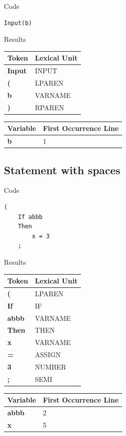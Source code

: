 \documentclass{article}
\begin{document}
\begin{resultbox}{Code}
\begin{lstlisting}[style=yalccstyle]
Input(b)
\end{lstlisting}
\end{resultbox}

\begin{resultbox}{Results}
\begin{tabularx}{\linewidth}{|>{\bfseries}X|X|}
\toprule
Token & Lexical Unit \\
\midrule
Input & INPUT \\
( & LPAREN \\
b & VARNAME \\
) & RPAREN \\
\bottomrule
\end{tabularx}

\vspace{2em}

\begin{tabularx}{\linewidth}{|>{\bfseries}X|X|}
\toprule
Variable & First Occurrence Line \\
\midrule
b & 1 \\
\bottomrule
\end{tabularx}
\end{resultbox}

\subsection{Statement with spaces}

\begin{resultbox}{Code}
\begin{lstlisting}[style=yalccstyle]
(
    If abbb
    Then
        x = 3
    ;
\end{lstlisting}
\end{resultbox}

\begin{resultbox}{Results}
\begin{tabularx}{\linewidth}{|>{\bfseries}X|X|}
\toprule
Token & Lexical Unit \\
\midrule
( & LPAREN \\
If & IF \\
abbb & VARNAME \\
Then & THEN \\
x & VARNAME \\
= & ASSIGN \\
3 & NUMBER \\
; & SEMI \\
\bottomrule
\end{tabularx}

\vspace{2em}

\begin{tabularx}{\linewidth}{|>{\bfseries}X|X|}
\toprule
Variable & First Occurrence Line \\
\midrule
abbb & 2 \\
x & 5 \\
\bottomrule
\end{tabularx}
\end{resultbox}
\end{document}

